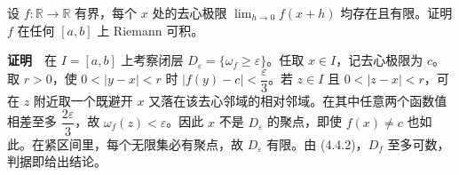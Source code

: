 \documentclass[11pt,a4paper]{article}
\begin{document}
设 \(f:\mathbb R\to\mathbb R\) 有界，每个 \(x\) 处的去心极限
\(\lim_{h\to0}f(x+h)\) 均存在且有限。证明 \(f\) 在任何 \([a,b]\) 上
Riemann 可积。

\textbf{证明}　在 \(I=[a,b]\) 上考察闭层
\(D_\varepsilon=\{\omega_f\ge\varepsilon\}\)。任取
\(x\in I\)，记去心极限为 \(c\)。取 \(r>0\)，使 \(0<|y-x|<r\) 时
\(|f(y)-c|<\dfrac{\varepsilon}{3}\)。若 \(z\in I\) 且
\(0<|z-x|<r\)，可在 \(z\) 附近取一个既避开 \(x\)
又落在该去心邻域的相对邻域。在其中任意两个函数值相差至多
\(\dfrac{2\varepsilon}{3}\)，故 \(\omega_f(z)<\varepsilon\)。因此 \(x\)
不是 \(D_\varepsilon\) 的聚点，即使 \(f(x)\ne c\)
也如此。在紧区间里，每个无限集必有聚点，故 \(D_\varepsilon\) 有限。由
(4.4.2)，\(D_f\) 至多可数，判据即给出结论。
\end{document}
